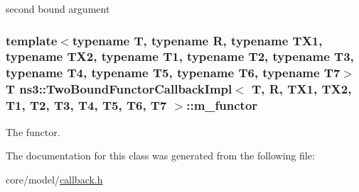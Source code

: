 second bound argument 

\subsubsection[{\texorpdfstring{m\+\_\+functor}{m_functor}}]{\setlength{\rightskip}{0pt plus 5cm}template$<$typename T, typename R, typename T\+X1, typename T\+X2, typename T1, typename T2, typename T3, typename T4, typename T5, typename T6, typename T7$>$ T {\bf ns3\+::\+Two\+Bound\+Functor\+Callback\+Impl}$<$ T, R, T\+X1, T\+X2, T1, T2, T3, T4, T5, T6, T7 $>$\+::m\+\_\+functor\hspace{0.3cm}{\ttfamily [private]}}\hypertarget{classns3_1_1TwoBoundFunctorCallbackImpl_a5234eab89930da790dc2139129dcecb8}{}\label{classns3_1_1TwoBoundFunctorCallbackImpl_a5234eab89930da790dc2139129dcecb8}


The functor. 



The documentation for this class was generated from the following file\+:\begin{DoxyCompactItemize}
\item 
core/model/\hyperlink{callback_8h}{callback.\+h}\end{DoxyCompactItemize}
